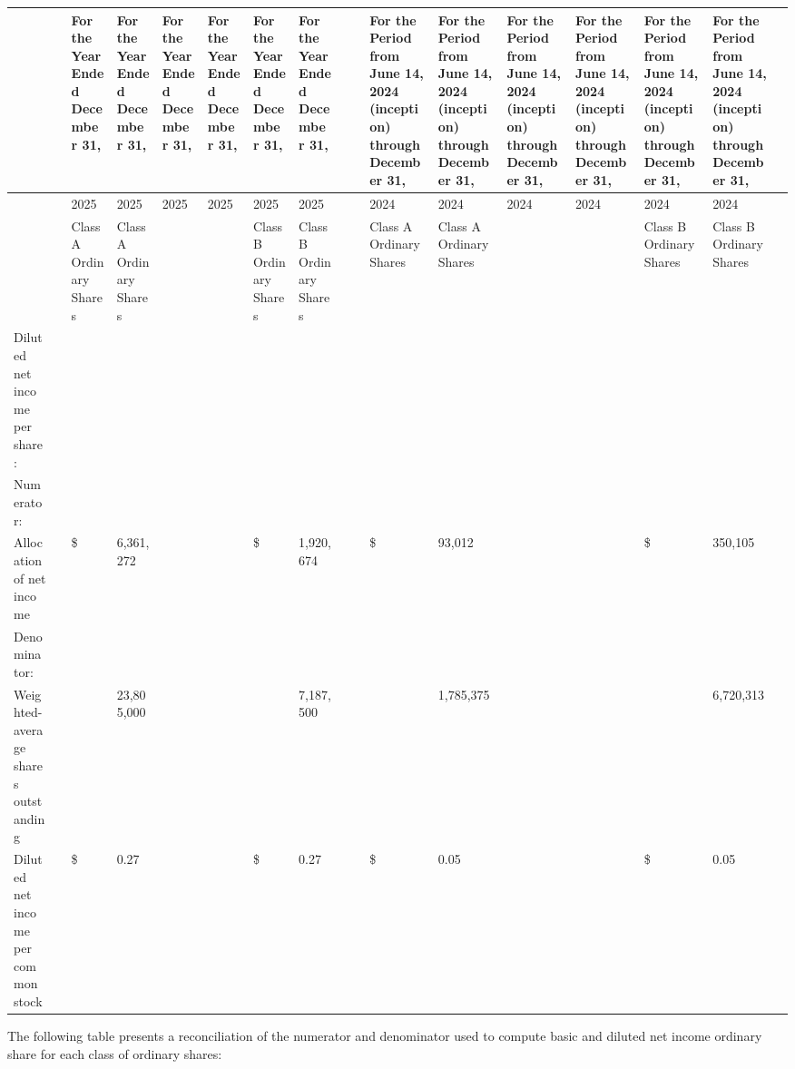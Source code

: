 \documentclass[11pt,a4paper]{article}
\begin{document}
\begin{table}[h]
\begin{tabular}{|l|l|l|l|l|l|l|l|l|l|l|l|l|l|l|l|l|}
\hline
 &  & For the Year Ended December 31, & For the Year Ended December 31, & For the Year Ended December 31, & For the Year Ended December 31, & For the Year Ended December 31, & For the Year Ended December 31, &  &  & For the Period from June 14, 2024 (inception) through December 31, & For the Period from June 14, 2024 (inception) through December 31, & For the Period from June 14, 2024 (inception) through December 31, & For the Period from June 14, 2024 (inception) through December 31, & For the Period from June 14, 2024 (inception) through December 31, & For the Period from June 14, 2024 (inception) through December 31, &  \\ \hline
 &  & 2025 & 2025 & 2025 & 2025 & 2025 & 2025 &  &  & 2024 & 2024 & 2024 & 2024 & 2024 & 2024 &  \\ \hline
 &  & Class A Ordinary Shares & Class A Ordinary Shares &  &  & Class B Ordinary Shares & Class B Ordinary Shares &  &  & Class A Ordinary Shares & Class A Ordinary Shares &  &  & Class B Ordinary Shares & Class B Ordinary Shares &  \\ \hline
Diluted net income per share: &  &  &  &  &  &  &  &  &  &  &  &  &  &  &  &  \\ \hline
Numerator: &  &  &  &  &  &  &  &  &  &  &  &  &  &  &  &  \\ \hline
Allocation of net income &  & \$ & 6,361,272 &  &  & \$ & 1,920,674 &  &  & \$ & 93,012 &  &  & \$ & 350,105 &  \\ \hline
Denominator: &  &  &  &  &  &  &  &  &  &  &  &  &  &  &  &  \\ \hline
Weighted-average shares outstanding &  &  & 23,805,000 &  &  &  & 7,187,500 &  &  &  & 1,785,375 &  &  &  & 6,720,313 &  \\ \hline
Diluted net income per common stock &  & \$ & 0.27 &  &  & \$ & 0.27 &  &  & \$ & 0.05 &  &  & \$ & 0.05 &  \\ \hline
\end{tabular}
\end{table}

The following table presents a reconciliation of the numerator and denominator used to compute basic and diluted net income ordinary share for each class of ordinary shares:
\end{document}
